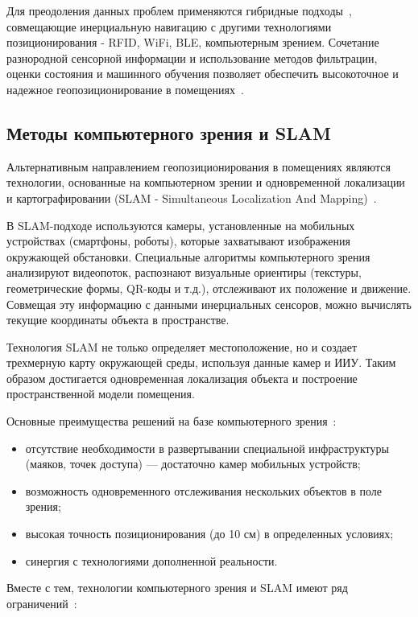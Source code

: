 Для преодоления данных проблем применяются гибридные подходы~\cite{hybridilf}, совмещающие инерциальную навигацию с другими технологиями позиционирования - RFID, WiFi, BLE, компьютерным зрением. Сочетание разнородной сенсорной информации и использование методов фильтрации, оценки состояния и машинного обучения позволяет обеспечить высокоточное и надежное геопозиционирование в помещениях~\cite{basebook}.

\subsection{Методы компьютерного зрения и SLAM}

Альтернативным направлением геопозиционирования в помещениях являются технологии, основанные на компьютерном зрении и одновременной локализации и картографировании (SLAM - Simultaneous Localization And Mapping)~\cite{slambased}.

В SLAM-подходе используются камеры, установленные на мобильных устройствах (смартфоны, роботы), которые захватывают изображения окружающей обстановки. Специальные алгоритмы компьютерного зрения анализируют видеопоток, распознают визуальные ориентиры (текстуры, геометрические формы, QR-коды и т.д.), отслеживают их положение и движение. Совмещая эту информацию с данными инерциальных сенсоров, можно вычислять текущие координаты объекта в пространстве.

Технология SLAM не только определяет местоположение, но и создает трехмерную карту окружающей среды, используя данные камер и ИИУ. Таким образом достигается одновременная локализация объекта и построение пространственной модели помещения.

Основные преимущества решений на базе компьютерного зрения~\cite{compvision}:

\begin{itemize}[label=---]
    \item отсутствие необходимости в развертывании специальной инфраструктуры (маяков, точек доступа) --- достаточно камер мобильных устройств;
    \item возможность одновременного отслеживания нескольких объектов в поле зрения;
    \item высокая точность позиционирования (до 10 см) в определенных условиях;
    \item синергия с технологиями дополненной реальности.
\end{itemize}


Вместе с тем, технологии компьютерного зрения и SLAM имеют ряд ограничений~\cite{slambased}:


